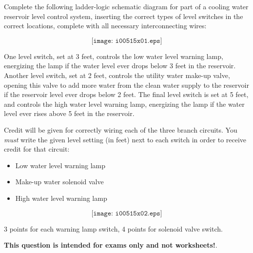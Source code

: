 

Complete the following ladder-logic schematic diagram for part of a cooling water reservoir level control system, inserting the correct types of level switches in the correct locations, complete with all necessary interconnecting wires:

$$\texttt{[image: i00515x01.eps]}$$

One level switch, set at 3 feet, controls the low water level warning lamp, energizing the lamp if the water level ever drops below 3 feet in the reservoir.  Another level switch, set at 2 feet, controls the utility water make-up valve, opening this valve to add more water from the clean water supply to the reservoir if the reservoir level ever drops below 2 feet.  The final level switch is set at 5 feet, and controls the high water level warning lamp, energizing the lamp if the water level ever rises above 5 feet in the reservoir.

\vskip 10pt

\noindent
Credit will be given for correctly wiring each of the three branch circuits.  You {\it must} write the given level setting (in feet) next to each switch in order to receive credit for that circuit:

\begin{itemize}
\item{} Low water level warning lamp
\item{} Make-up water solenoid valve
\item{} High water level warning lamp
\end{itemize}







$$\texttt{[image: i00515x02.eps]}$$

3 points for each warning lamp switch, 4 points for solenoid valve switch.







{\bf This question is intended for exams only and not worksheets!}.



